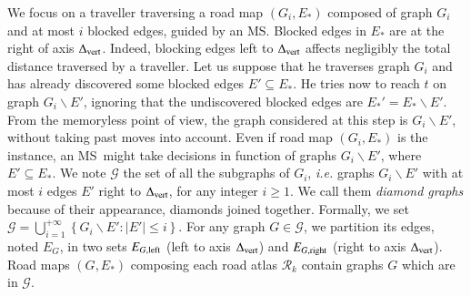 \documentclass[preprint]{elsarticle}
\newcommand{\set}[1]{\left\{ #1 \right\}}
\newcommand{\card}[1]{\left| #1 \right|}
\newcommand{\mcalg}{\mathcal{G}}
\newcommand{\mcalr}{\mathcal{R}}
\newcommand{\mts}{MS}
\newcommand{\deltavert}{\Delta_{\mbox{\scriptsize{vert}}}}
\newcommand{\eleft}[1]{E_{#1, \mbox{\scriptsize{left}}}}
\newcommand{\eright}[1]{E_{#1, \mbox{\scriptsize{right}}}}
\begin{document}

We focus on a traveller traversing a road map $\left(G_i,E_*\right)$ composed of graph $G_i$ and at most $i$ blocked edges, guided by an \mts . Blocked edges in $E_*$ are at the right of axis $\deltavert$. Indeed, blocking edges left to $\deltavert$ affects negligibly the total distance traversed by a traveller. Let us suppose that he traverses graph $G_i$ and has already discovered some blocked edges $E' \subseteq E_*$. He tries now to reach $t$ on graph $G_i\backslash E'$, ignoring that the undiscovered blocked edges are $E_*' = E_* \backslash E'$. From the memoryless point of view, the graph considered at this step is $G_i\backslash E'$, without taking past moves into account. Even if road map $\left(G_i,E_*\right)$ is the instance, an \mts ~might take decisions in function of graphs $G_i\backslash E'$, where $E' \subseteq E_*$.
We note $\mcalg$ the set of all the subgraphs of $G_i$, {\em i.e.} graphs $G_i\backslash E'$ with at most $i$ edges $E'$ right to $\deltavert$, for any integer $i \geq 1$. We call them \textit{diamond graphs} because of their appearance, diamonds joined together. Formally, we set $\mcalg = \bigcup_{i=1}^{+\infty} \set{G_i\backslash E' : \card{E'} \leq i}$. For any graph $G \in \mcalg$, we partition its edges, noted $E_G$, in two sets $\eleft{G}$ (left to axis $\deltavert$) and $\eright{G}$ (right to axis $\deltavert$). Road maps $\left(G,E_*\right)$ composing each road atlas $\mcalr_k$ contain graphs $G$ which are in $\mcalg$. 
\end{document}
